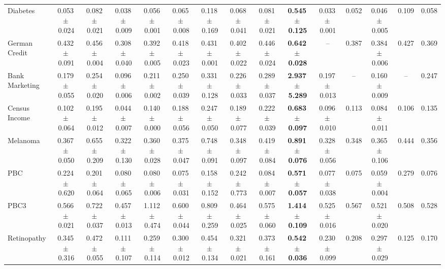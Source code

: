\documentclass[8pt]{extarticle}
\begin{document}
\begin{longtable}{l*{14}{c}}
Diabetes & 0.053\,$\pm$\,0.024 & 0.082\,$\pm$\,0.021 & 0.038\,$\pm$\,0.009 & 0.056\,$\pm$\,0.001 & 0.065\,$\pm$\,0.008 & 0.118\,$\pm$\,0.169 & 0.068\,$\pm$\,0.041 & 0.081\,$\pm$\,0.021 & \textbf{0.545\,$\pm$\,0.125} & 0.033\,$\pm$\,0.001 & 0.052 & 0.046\,$\pm$\,0.005 & 0.109 & 0.058 \\
German Credit & 0.432\,$\pm$\,0.091 & 0.456\,$\pm$\,0.004 & 0.308\,$\pm$\,0.040 & 0.392\,$\pm$\,0.005 & 0.418\,$\pm$\,0.023 & 0.431\,$\pm$\,0.001 & 0.402\,$\pm$\,0.022 & 0.446\,$\pm$\,0.024 & \textbf{0.642\,$\pm$\,0.028} & -- & 0.387 & 0.384\,$\pm$\,0.006 & 0.427 & 0.369 \\
Bank Marketing & 0.179\,$\pm$\,0.055 & 0.254\,$\pm$\,0.020 & 0.096\,$\pm$\,0.006 & 0.211\,$\pm$\,0.002 & 0.250\,$\pm$\,0.039 & 0.331\,$\pm$\,0.128 & 0.226\,$\pm$\,0.033 & 0.289\,$\pm$\,0.037 & \textbf{2.937\,$\pm$\,5.289} & 0.197\,$\pm$\,0.013 & -- & 0.160\,$\pm$\,0.009 & -- & 0.247 \\
Census Income & 0.102\,$\pm$\,0.064 & 0.195\,$\pm$\,0.012 & 0.044\,$\pm$\,0.007 & 0.140\,$\pm$\,0.000 & 0.188\,$\pm$\,0.056 & 0.247\,$\pm$\,0.050 & 0.189\,$\pm$\,0.077 & 0.222\,$\pm$\,0.039 & \textbf{0.683\,$\pm$\,0.097} & 0.096\,$\pm$\,0.010 & 0.113 & 0.084\,$\pm$\,0.011 & 0.106 & 0.135 \\
Melanoma & 0.367\,$\pm$\,0.050 & 0.655\,$\pm$\,0.209 & 0.322\,$\pm$\,0.130 & 0.360\,$\pm$\,0.028 & 0.375\,$\pm$\,0.047 & 0.748\,$\pm$\,0.091 & 0.348\,$\pm$\,0.097 & 0.419\,$\pm$\,0.084 & \textbf{0.891\,$\pm$\,0.076} & 0.328\,$\pm$\,0.056 & 0.348 & 0.365\,$\pm$\,0.106 & 0.444 & 0.356 \\
PBC & 0.224\,$\pm$\,0.620 & 0.201\,$\pm$\,0.064 & 0.080\,$\pm$\,0.065 & 0.080\,$\pm$\,0.006 & 0.075\,$\pm$\,0.031 & 0.158\,$\pm$\,0.152 & 0.242\,$\pm$\,0.773 & 0.084\,$\pm$\,0.007 & \textbf{0.571\,$\pm$\,0.057} & 0.077\,$\pm$\,0.038 & 0.075 & 0.059\,$\pm$\,0.004 & 0.279 & 0.076 \\
PBC3 & 0.566\,$\pm$\,0.021 & 0.722\,$\pm$\,0.037 & 0.457\,$\pm$\,0.013 & 1.112\,$\pm$\,0.474 & 0.600\,$\pm$\,0.044 & 0.809\,$\pm$\,0.259 & 0.464\,$\pm$\,0.025 & 0.575\,$\pm$\,0.060 & \textbf{1.414\,$\pm$\,0.109} & 0.525\,$\pm$\,0.016 & 0.567 & 0.521\,$\pm$\,0.020 & 0.508 & 0.528 \\
Retinopathy & 0.345\,$\pm$\,0.316 & 0.472\,$\pm$\,0.055 & 0.111\,$\pm$\,0.107 & 0.259\,$\pm$\,0.114 & 0.300\,$\pm$\,0.012 & 0.454\,$\pm$\,0.134 & 0.321\,$\pm$\,0.021 & 0.373\,$\pm$\,0.161 & \textbf{0.542\,$\pm$\,0.036} & 0.230\,$\pm$\,0.099 & 0.208 & 0.297\,$\pm$\,0.029 & 0.125 & 0.170 \\

\end{longtable}
\end{document}
